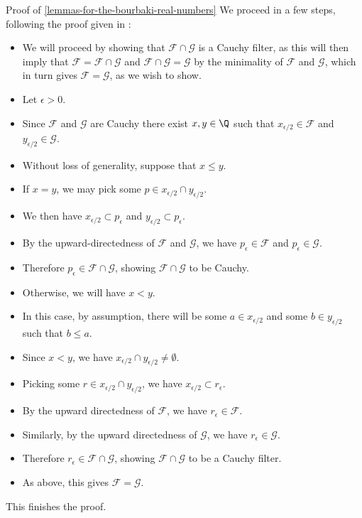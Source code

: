 \begin{Proof}{Proof of \cref{lemmas-for-the-bourbaki-real-numbers}}%
    We proceed in a few steps, following the proof given in \cite[Lemma 4.3]{weiss:the-reals-as-rational-cauchy-filters}:
    \begin{itemize}
        \item We will proceed by showing that $\mathcal{F}\cap\mathcal{G}$ is a Cauchy filter, as this will then imply that $\mathcal{F}=\mathcal{F}\cap\mathcal{G}$ and $\mathcal{F}\cap\mathcal{G}=\mathcal{G}$ by the minimality of $\mathcal{F}$ and $\mathcal{G}$, which in turn gives $\mathcal{F}=\mathcal{G}$, as we wish to show.
        \item Let $\epsilon\gt0$.
        \item Since $\mathcal{F}$ and $\mathcal{G}$ are Cauchy there exist $x,y\in\Q$ such that $x_{\epsilon/2}\in\mathcal{F}$ and $y_{\epsilon/2}\in\mathcal{G}$.
        \item Without loss of generality, suppose that $x\leq y$.
        \item If $x=y$, we may pick some $p\in x_{\epsilon/2}\cap y_{\epsilon/2}$.
        \item We then have $x_{\epsilon/2}\subset p_{\epsilon}$ and $y_{\epsilon/2}\subset p_{\epsilon}$.
        \item By the upward-directedness of $\mathcal{F}$ and $\mathcal{G}$, we have $p_{\epsilon}\in\mathcal{F}$ and $p_{\epsilon}\in\mathcal{G}$.
        \item Therefore $p_{\epsilon}\in\mathcal{F}\cap\mathcal{G}$, showing $\mathcal{F}\cap\mathcal{G}$ to be Cauchy.
        \item Otherwise, we will have $x\lt y$.
        \item In this case, by assumption, there will be some $a\in x_{\epsilon/2}$ and some $b\in y_{\epsilon/2}$ such that $b\leq a$.
        \item Since $x\lt y$, we have $x_{\epsilon/2}\cap y_{\epsilon/2}\neq\emptyset$.
        \item Picking some $r\in x_{\epsilon/2}\cap y_{\epsilon/2}$, we have $x_{\epsilon/2}\subset r_{\epsilon}$.
        \item By the upward directedness of $\mathcal{F}$, we have $r_{\epsilon}\in\mathcal{F}$.
        \item Similarly, by the upward directedness of $\mathcal{G}$, we have $r_{\epsilon}\in\mathcal{G}$.
        \item Therefore $r_{\epsilon}\in\mathcal{F}\cap\mathcal{G}$, showing $\mathcal{F}\cap\mathcal{G}$ to be a Cauchy filter.
        \item As above, this gives $\mathcal{F}=\mathcal{G}$.
    \end{itemize}
    This finishes the proof.


\end{Proof}
